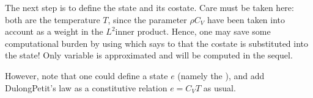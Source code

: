 \documentclass[letterpaper,10pt,english]{sphinxmanual}
\begin{document}
\begin{sphinxVerbatim}[commandchars=\\\{\}]

  

      
\end{sphinxVerbatim}

\sphinxAtStartPar
The next step is to define the state and its co\sphinxhyphen{}state. Care must be
taken here: both are the temperature \(T\), since the parameter
\(\rho C_V\) have been taken into account as a weight in the
\(L^2\)\sphinxhyphen{}inner product. Hence, one may save some computational burden
by using  which says to  that the co\sphinxhyphen{}state
is substituted into the state! Only  variable is approximated and
will be computed in the sequel.

\sphinxAtStartPar
However, note that one could define a state \(e\) (namely the
), and add Dulong\sphinxhyphen{}Petit’s law as a constitutive
relation \(e = C_V T\) as usual.
\end{document}

